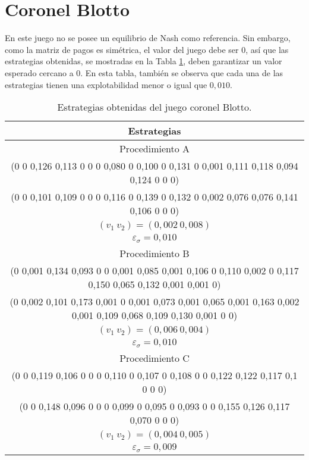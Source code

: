 \section*{Coronel Blotto}

En este juego no se posee un equilibrio de Nash como referencia. Sin embargo, como la matriz de pagos es simétrica, el valor del juego debe ser $0$, así que las estrategias obtenidas, se mostradas en la Tabla \ref{tab:estrategias-coronel-blotto}, deben garantizar un valor esperado cercano a $0$. En esta tabla, también se observa que cada una de las estrategias tienen una explotabilidad menor o igual que $0,010$.

\begin{table}[h]
    \centering
    \caption{Estrategias obtenidas del juego coronel Blotto.}
    \label{tab:estrategias-coronel-blotto}
    \scriptsize
    \begin{tabular}{c}
    \toprule
        Estrategias \\
        \midrule
        Procedimiento A \\ \midrule
         (0 0 0,126 0,113 0 0 0 0,080 0 0,100 0 0,131 0 0,001 0,111 0,118 0,094 0,124 0 0 0) \\
         (0 0 0,101 0,109 0 0 0 0,116 0 0,139 0 0,132 0 0,002 0,076 0,076 0,141 0,106 0 0 0) \\
         $(v_1\ v_2) = (0,002\ 0,008)$ \\
         $\varepsilon_{\sigma} = 0,010$ \\
        \midrule
        Procedimiento B \\ \midrule
         (0 0,001 0,134 0,093 0 0 0,001 0,085 0,001 0,106 0 0,110 0,002 0 0,117 0,150 0,065 0,132 0,001 0,001 0) \\
         (0 0,002 0,101 0,173 0,001 0 0,001 0,073 0,001 0,065 0,001 0,163 0,002 0,001 0,109 0,068 0,109 0,130 0,001 0 0) \\
         $(v_1\ v_2) = (0,006\ 0,004)$ \\
         $\varepsilon_{\sigma} = 0,010$ \\
        \midrule
        Procedimiento C \\ \midrule
         (0 0 0,119 0,106 0 0 0 0,110 0 0,107 0 0,108 0 0 0,122 0,122 0,117 0,1 0 0 0) \\
         (0 0 0,148 0,096 0 0 0 0,099 0 0,095 0 0,093 0 0 0,155 0,126 0,117 0,070 0 0 0) \\
         $(v_1\ v_2) = (0,004\ 0,005)$ \\
         $\varepsilon_{\sigma} = 0,009$ \\
        \bottomrule
    \end{tabular}
\end{table}

